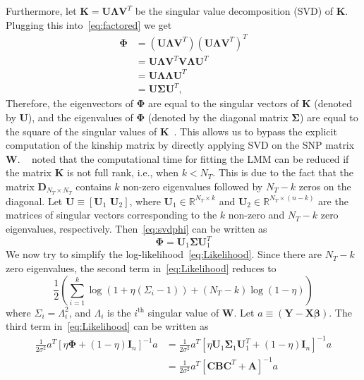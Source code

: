 \documentclass[12pt,letter]{article}\usepackage[]{graphicx}\usepackage[]{color}
\newcommand{\tm}[1]{\textrm{{#1}}}
\newcommand{\bB}{\mb{B}}
\newcommand{\bC}{\mb{C}}
\newcommand{\bX}{\textbf{X}}
\newcommand{\bW}{\textbf{W}}
\newcommand{\bY}{\textbf{Y}}
\newcommand{\bD}{\textbf{D}}
\newcommand{\bU}{\textbf{U}}
\newcommand{\bI}{\textbf{I}}
\newcommand{\bSigma}{\boldsymbol{\Sigma}}
\newcommand{\bLambda}{\boldsymbol{\Lambda}}
\newcommand{\mb}[1]{\mathbf{#1}}
\newcommand{\bbeta}{\boldsymbol{\beta}}
\newcommand{\bPhi}{\boldsymbol{\Phi}}
\begin{document}
Furthermore, let $\mb{K} = \mb{U} \bLambda \mb{V}^T$ be the singular value decomposition (SVD) of $\mb{K}$. Plugging this into~\eqref{eq:factored} we get
\begin{align}
	\bPhi &= \left(\mb{U} \bLambda \mb{V}^T\right)\left(\mb{U} \bLambda \mb{V}^T\right)^T \nonumber\\
	& = \mb{U}\bLambda\mb{V}^T\mb{V}\bLambda\mb{U}^T \nonumber\\
	& = \mb{U} \bLambda\bLambda\mb{U}^T \nonumber\\
	& = \mb{U} \bSigma \mb{U}^T, \label{eq:svdphi}
\end{align}
Therefore, the eigenvectors of $\bPhi$ are equal to the singular vectors of $\mb{K}$ (denoted by $\bU$), and the eigenvalues of $\bPhi$ (denoted by the diagonal matrix $\bSigma$) are equal to the square of the singular values of $\mb{K}$~\citep{berrar2003practical}. This allows us to bypass the explicit computation of the kinship matrix by directly applying SVD on the SNP matrix $\bW$. ~\cite{lippert2011fast} noted that the computational time for fitting the LMM can be reduced if the matrix $\mb{K}$ is not full rank, i.e., when $k < N_T$. This is due to the fact that the matrix $\bD_{N_T \times N_T}$ contains $k$ non-zero eigenvalues followed by $N_T-k$ zeros on the diagonal. Let $\bU \equiv \left[\bU_1 \,\, \bU_2\right]$, where $\bU_1 \in \mathbb{R}^{N_T\times k}$ and $\bU_2 \in \mathbb{R}^{N_T \times (n-k)}$ are  the matrices of singular vectors corresponding to the $k$ non-zero and $N_T-k$ zero eigenvalues, respectively. Then~\eqref{eq:svdphi} can be written as
\begin{equation}
	\bPhi = \bU_1 \bSigma \bU_1^T
\end{equation}
We now try to simplify the log-likelihood~\eqref{eq:Likelihood}. Since there are $N_T-k$ zero eigenvalues, the second term in~\eqref{eq:Likelihood} reduces to
\begin{equation}
	\frac{1}{2} \left(  \sum_{i=1}^{k} \log(1 + \eta (\Sigma_i-1)) + (N_T-k) \log(1-\eta)\right) \label{eq:term2}
\end{equation}
where $\Sigma_i = \Lambda_i^2$, and $\Lambda_i$ is the $i^{\tm{th}}$ singular value of $\bW$. Let $a \equiv (\bY - \bX \bbeta)$. The third term in~\eqref{eq:Likelihood} can be written as
\begin{align}
	\frac{1}{2\sigma^2} a^T \left[ \eta \bPhi + (1-\eta)\bI_n \right] ^{-1} a &= \frac{1}{2\sigma^2} a^T \left[ \eta \bU_1 \bSigma_1 \bU_1^T + (1-\eta)\bI_n \right] ^{-1} a  \nonumber \\
	& = \frac{1}{2\sigma^2} a^T \left[ \bC \bB \bC^T + \mb{A} \right] ^{-1} a \nonumber
\end{align}
\end{document}
